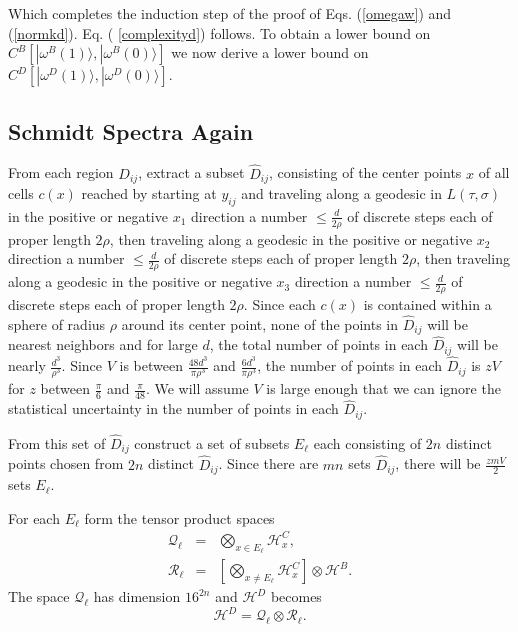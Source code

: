\documentclass[12pt,amsmath,amssymb,onecolumn]{revtex4-2}
\begin{document}
Which completes the induction step of the proof of Eqs. (\ref{omegaw}) and (\ref{normkd}).
Eq. ( \ref{complexityd}) follows. To obtain a lower bound on $C^B[ |\omega^B(1) \rangle , |\omega^B( 0) \rangle ]$
we now derive a lower bound on $C^D[ |\omega^D(1) \rangle , |\omega^D( 0) \rangle ]$.



\subsection{\label{subsec:schmidtspectrar} Schmidt Spectra Again}


From each region $D_{ij}$, extract a subset $\hat{D}_{ij}$,
consisting of the center points $x$ of all cells $c(x)$ reached 
by starting at $y_{ij}$ and
traveling along a geodesic in $L(\tau, \sigma)$
in the positive or negative $x_1$ direction 
a number $\le \frac{d}{2 \rho}$ of discrete steps each of proper length $2 \rho$,
then traveling along a geodesic
in the positive or negative $x_2$ direction 
a number $\le \frac{d}{2 \rho}$ of discrete steps each of proper length $2 \rho$,
then traveling along a geodesic
in the positive or negative $x_3$ direction 
a number $\le \frac{d}{2 \rho}$ of discrete steps each of proper length $2 \rho$.
Since each $c(x)$ is contained within a sphere of radius $\rho$ around
its center point, none of the points in $\hat{D}_{ij}$ will be nearest neighbors
and for large $d$, the total number of points in each $\hat{D}_{ij}$ will
be nearly $\frac{d^3}{\rho^3}$.  Since $V$ is
between $\frac{48 d^3}{\pi \rho^3}$ and $\frac{ 6 d^3}{\pi \rho^3}$,
the number of points in each $\hat{D}_{ij}$ is $z V$ for
$z$ between $\frac{\pi}{6}$ and $\frac{\pi}{48}$.
We will assume $V$ is large enough that we can
ignore the statistical
uncertainty in the number of points in each $\hat{D}_{ij}$.


From this set of $\hat{D}_{ij}$ construct a set of subsets $E_\ell$ 
each consisting of $2n$ distinct points chosen from $2n$ distinct $\hat{D}_{ij}$.
Since there are $m n$ sets $\hat{D}_{ij}$, there will be $\frac{z m V}{2}$
sets $E_\ell$.

For each $E_\ell$ form the 
tensor product spaces
\begin{subequations}
\begin{eqnarray}
\label{defqell1}
\mathcal{Q}_\ell &=& \bigotimes_{x \in E_\ell} \mathcal{H}_x^C, \\
\label{defrell1}
\mathcal{R}_\ell &=& [\bigotimes_{x \ne E_\ell} \mathcal{H}_x^C] \otimes  \mathcal{H}^B.
\end{eqnarray}
\end{subequations}
The space $\mathcal{Q}_\ell$ has dimension $16^{2n}$ and
$\mathcal{H}^D$ becomes 
\begin{equation}
\label{deftp1}
\mathcal{H}^D = \mathcal{Q}_\ell \otimes \mathcal{R}_\ell.
\end{equation}
\end{document}
